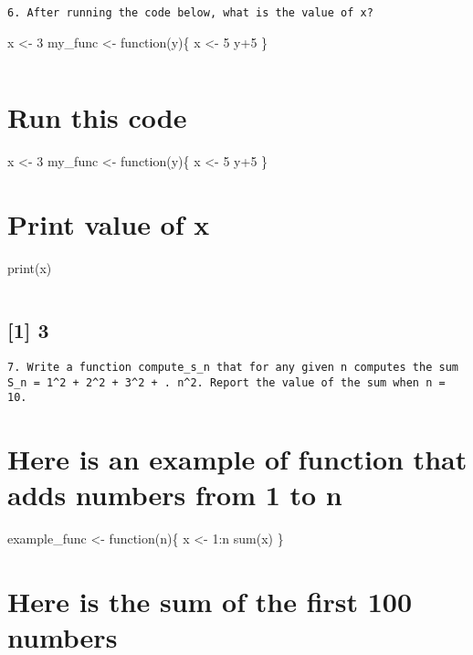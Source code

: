 \documentclass[
]{article}
\begin{document}
\begin{verbatim}
6. After running the code below, what is the value of x?
\end{verbatim}

x \textless- 3 my\_func \textless- function(y)\{ x \textless- 5 y+5 \}

\begin{verbatim}
\end{verbatim}

\hypertarget{run-this-code}{%
\section{Run this code}\label{run-this-code}}

x \textless- 3 my\_func \textless- function(y)\{ x \textless- 5 y+5 \}

\hypertarget{print-value-of-x}{%
\section{Print value of x}\label{print-value-of-x}}

print(x)

\begin{verbatim}
\end{verbatim}

\hypertarget{section-4}{%
\subsection{{[}1{]} 3}\label{section-4}}

\begin{verbatim}
7. Write a function compute_s_n that for any given n computes the sum S_n = 1^2 + 2^2 + 3^2 + . n^2. Report the value of the sum when n = 10.
\end{verbatim}

\hypertarget{here-is-an-example-of-function-that-adds-numbers-from-1-to-n}{%
\section{Here is an example of function that adds numbers from 1 to
n}\label{here-is-an-example-of-function-that-adds-numbers-from-1-to-n}}

example\_func \textless- function(n)\{ x \textless- 1:n sum(x) \}

\hypertarget{here-is-the-sum-of-the-first-100-numbers}{%
\section{Here is the sum of the first 100
numbers}\label{here-is-the-sum-of-the-first-100-numbers}}
\end{document}
